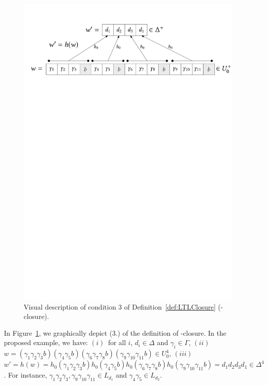 \begin{figure}
    \centering
    \includegraphics[width=\linewidth]{Chaps/TOCL17/LTLclos3.pdf}
    \caption{ 
            Visual description of condition 3 of Definition~\ref{def:LTLClosure} (\LTL-closure). 
    }
    \label{fig:LTLclos3}
\end{figure}
  
In Figure~\ref{fig:LTLclos3}, we graphically  depict (3.) of the definition of \LTL-closure. In the proposed example, we have:
              $(i)$~for all $i$, $d_i\in \Delta$ and $\gamma_i\in\Gamma$,
              $(ii)$~$w= (\gamma_1\gamma_2 \gamma_3 b) ( \gamma_4\gamma_5 b) ( \gamma_6\gamma_7 \gamma_8 b)( \gamma_9\gamma_{10} \gamma_{11} b)\in U_0^4$,
              $(iii)$~$w'=h(w)=h_0(\gamma_1\gamma_2 \gamma_3 b)h_0(\gamma_4\gamma_5 b)\allowbreak h_0(\gamma_6\gamma_7 \gamma_8 b)h_0(\gamma_9\gamma_{10} \gamma_{11} b)=d_1 d_2 d_3 d_1 \in\Delta^4$.
            For instance, $\gamma_1\gamma_2\gamma_3,\gamma_9\gamma_{10} \gamma_{11}\in L_{d_1}$ and $\gamma_4\gamma_5\in L_{d_2}$.

